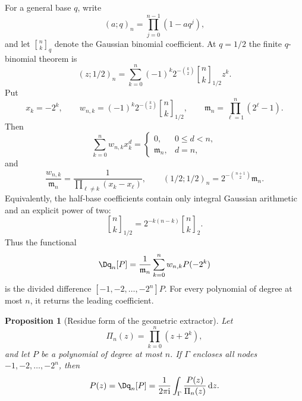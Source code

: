 \documentclass[11pt,oneside]{article}
\newtheorem{proposition}[proposition]{Proposition}
\theoremstyle{definition}
\theoremstyle{remark}
\newcommand{\ii}{\mathrm i}
\newcommand{\dd}{\,\mathrm d}
\newcommand{\qbinom}[3]{\genfrac{[}{]}{0pt}{}{#1}{#2}_{#3}}
\begin{document}
For a general base $q$, write
\begin{equation}
 (a;q)_n=\prod_{j=0}^{n-1}(1-aq^j),                       \label{dyadicweb:eq:qpoch-def-local}
\end{equation}
and let $\qbinom nkq$ denote the Gaussian binomial coefficient.  At $q=1/2$ the finite
$q$-binomial theorem is
\begin{equation}
 (z;1/2)_n=\sum_{k=0}^{n}(-1)^k2^{-\binom k2}
 \qbinom nk{1/2}z^k.                                      \label{dyadicweb:eq:finite-q-binomial-local}
\end{equation}
Put
\begin{equation}
 x_k=-2^k,
 \qquad
 w_{n,k}=(-1)^k2^{-\binom k2}\qbinom nk{1/2},
 \qquad
 \mathfrak m_n=\prod_{\ell=1}^{n}(2^\ell-1).              \label{dyadicweb:eq:q-nodes-weights}
\end{equation}
Then
\begin{equation}
 \sum_{k=0}^{n}w_{n,k}x_k^d=
 \begin{cases}
 0,&0\le d<n,\\
 \mathfrak m_n,&d=n,
 \end{cases}                                               \label{dyadicweb:eq:q-node-moments}
\end{equation}
and
\begin{equation}
 \frac{w_{n,k}}{\mathfrak m_n}
 =\frac1{\prod_{\ell\ne k}(x_k-x_\ell)},
 \qquad
 (1/2;1/2)_n=2^{-\binom{n+1}{2}}\mathfrak m_n.             \label{dyadicweb:eq:q-barycentric-normalization}
\end{equation}
Equivalently, the half-base coefficients contain only integral Gaussian arithmetic and an
explicit power of two:
\begin{equation}
 \qbinom nk{1/2}=2^{-k(n-k)}\qbinom nk2.
 \label{dyadicweb:eq:qbinomial-inversion}
\end{equation}
Thus the functional
\begin{equation}
 \Dq_n[P]=\frac1{\mathfrak m_n}\sum_{k=0}^{n}w_{n,k}P(-2^k) \label{dyadicweb:eq:Dq-def}
\end{equation}
is the divided difference $[-1,-2,\ldots,-2^n]P$.  For every polynomial of degree at most
$n$, it returns the leading coefficient.

\begin{proposition}[Residue form of the geometric extractor]
\label{dyadicweb:prop:q-residue-extractor}
Let
\[
 \Pi_n(z)=\prod_{k=0}^{n}(z+2^k),
\]
and let $P$ be a polynomial of degree at most $n$.  If $\Gamma$ encloses all nodes
$-1,-2,\ldots,-2^n$, then
\begin{equation}
 [z^n]P(z)=\Dq_n[P]
 =\frac{1}{2\pi\ii}\int_\Gamma\frac{P(z)}{\Pi_n(z)}\dd z. \label{dyadicweb:eq:q-residue-extractor}
\end{equation}
\end{proposition}
\end{document}
